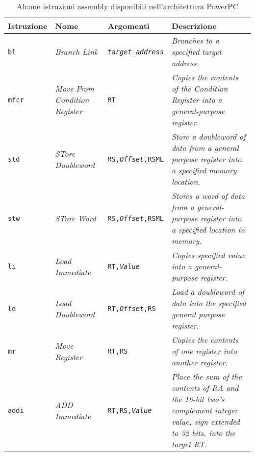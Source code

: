 \documentclass[10pt,a4paper, titlepage]{report}
\begin{document}
	\begin{table}[h!]
	  \begin{center}
	    \caption{Alcune istruzioni assembly disponibili nell'architettura PowerPC}
	    \centering
	    
	    \label{tab:AssemblyIstrucions}
	    \begin{adjustbox}{center=\textwidth}
	    \begin{tabular}{l|l|l|p{6cm}}
	      \toprule
	      Istruzione & Nome & Argomenti & Descrizione \\
	   		\midrule
	   		\texttt{bl} & \textit{Branch Link} & \texttt{\textit{target\_address}} & \textit{Branches to a specified target address.} \\
	   		
   	       \texttt{mfcr} & \textit{Move From Condition Register} & \texttt{RT} & \textit{Copies the contents of the Condition Register into a general-purpose register.} \\
 
	       \texttt{std} & \textit{STore Doubleword} & \texttt{RS,\textit{Offset},RSML} & \textit{Store a doubleword of data from a general purpose register into a specified memory location.}\\
	       
	       \texttt{stw} & \textit{STore Word} & \texttt{RS,\textit{Offset},RSML} & \textit{Stores a word of data from a general-purpose register into a specified location in memory.} \\
	       
	       \texttt{li} & \textit{Load Immediate} & \texttt{RT,\textit{Value}} & \textit{Copies specified value into a general-purpose register.} \\
	       
	       \texttt{ld} & \textit{Load Doubleword} & \texttt{RT,\textit{Offset},RS} & \textit{Load a doubleword of data into the specified general purpose register.} \\
	       
	       \texttt{mr} & \textit{Move Register} & \texttt{RT,RS} & \textit{Copies the contents of one register into another register.} \\
	       
	       \texttt{addi} & \textit{ADD Immediate} & \texttt{RT,RS,\textit{Value}} & \textit{Place the sum of the contents of RA and the 16-bit two's complement integer value, sign-extended to 32 bits, into the target RT.} \\
	       	

\end{tabular}
\end{adjustbox}
\end{center}
\end{table}
\end{document}
